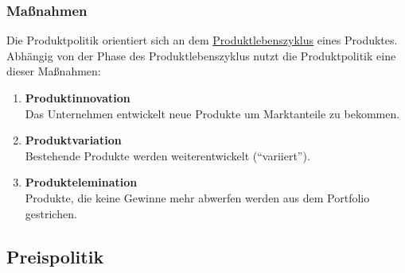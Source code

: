 \subsubsection{Maßnahmen}
\begin{flushleft}
    Die Produktpolitik orientiert sich an dem \hyperref[subsec:Produktlebenszyklus]{Produktlebenszyklus}
    eines Produktes. Abhängig von der Phase des Produktlebenszyklus nutzt die Produktpolitik eine dieser
    Maßnahmen:
    \begin{enumerate}
        \item {
            \textbf{Produktinnovation} \\
            Das Unternehmen entwickelt neue Produkte um Marktanteile zu bekommen.
        }
        \item {
            \textbf{Produktvariation} \\
            Bestehende Produkte werden weiterentwickelt (``variiert'').
        }
        \item {
            \textbf{Produktelemination} \\
            Produkte, die keine Gewinne mehr abwerfen werden aus dem Portfolio gestrichen.
        }
    \end{enumerate}
\end{flushleft}

\subsection{Preispolitik}
